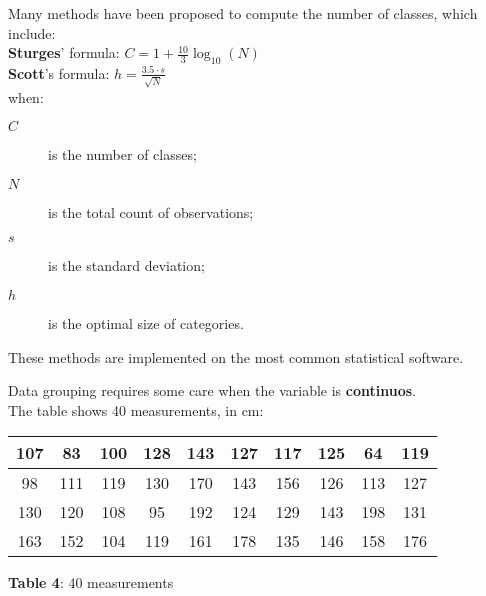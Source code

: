 \begin{frame}
  Many methods have been proposed to compute the number of classes, which include: \\
  \vspace*{.3cm}
  \textbf{Sturges}' formula: \hspace{1cm} $ C = 1 + \frac{10}{3} \log_{10}(N) $ \\
  \vspace*{.3cm}
  \textbf{Scott}'s formula: \hspace{1.4cm} $ h = \frac{3.5\cdot s}{\sqrt{N}} $ \\
  \vspace*{.4cm}
  when:\\
  \begin{description}
    \item[$C$] is the number of classes;
    \item[$N$] is the total count of observations;
    \item[$s$] is the standard deviation;
    \item[$h$] is the optimal size of categories.
  \end{description}
  \vspace*{.25cm}
  These methods are implemented on the most common statistical software. \\
\end{frame}

\begin{frame}
  \vspace*{1cm}
  Data grouping requires some care when the variable is \textbf{continuos}.\\
  \vspace*{.4cm}
  The table shows 40 measurements, in cm:\\
  \begin{table}
    \centering
    \begin{tabular}{|*{10}{c|}}
      \hline
      107 & 83 & 100 & 128 & 143 & 127 & 117 & 125 & 64 & 119\\
      \hline
      98 & 111 & 119 & 130 & 170 & 143 & 156 & 126 & 113 & 127\\
      \hline
      130 & 120 & 108 & 95 & 192 & 124 & 129 & 143 & 198 & 131\\
      \hline
      163 & 152 & 104 & 119 & 161 & 178 & 135 & 146 & 158 & 176\\
      \hline
    \end{tabular}
  \end{table}
  \vspace*{-.6cm}
  \begin{scriptsize}
    \begin{center}
      \textbf{Table 4}: 40 measurements
    \end{center}
  \end{scriptsize}
\end{frame}

